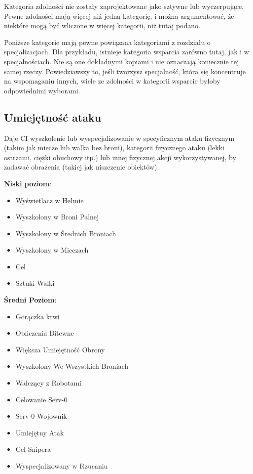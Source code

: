 Kategoria zdolności nie zostały zaprojektowane jako sztywne lub wyczerpujące. Pewne zdolności mają więcej niż jedną kategorię, i można argumentować, że niektóre mogą być wliczone w więcej kategorii, niż tutaj podano.

Poniższe kategorie mają pewne powiązana  kategoriami z rozdziału o specjalizacjach. Dla przykładu, istnieje kategoria wsparcia zarówno tutaj, jak i w specjalnościach. Nie są one dokładnymi kopiami i nie oznaczają koniecznie tej samej rzeczy. Powiedziawszy to, jeśli tworzysz specjalność, która się koncentruje na wspomaganiu innych, wiele ze zdolności w kategorii wsparcie byłoby odpowiednimi wyborami.

\subsection{Umiejętność ataku}

Daje CI wyszkolenie lub wyspecjalizowanie w specyficznym ataku fizycznym (takim jak miecze lub walka bez broni), kategorii fizycznego ataku (lekki ostrzami, ciężki obuchowy itp.) lub innej fizycznej akcji wykorzystywanej, by zadawać obrażenia (takiej jak niszczenie obiektów).

\textbf{Niski poziom}:

\begin{itemize}
\item Wyświetlacz w Hełmie
\item Wyszkolony w Broni Palnej
\item Wyszkolony w Średnich Broniach
\item Wyszkolony w Mieczach
\item Cel
\item Sztuki Walki
\end{itemize}

\textbf{Średni Poziom}:

\begin{itemize}
\item Gorączka krwi
\item Obliczenia Bitewne
\item Większa Umiejętność Obrony
\item Wyszkolony We Wszystkich Broniach
\item Walczący z Robotami
\item Celowanie Serv-0
\item Serv-0 Wojownik
\item Umiejętny Atak
\item Cel Snipera
\item Wyspecjalizowany w Rzucaniu
\end{itemize}

